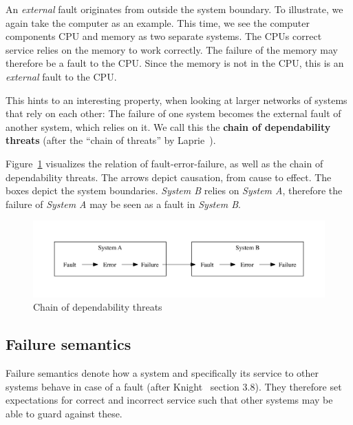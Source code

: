 An \emph{external} fault originates from outside the system boundary. To illustrate, we again take the computer as an example. This time, we see the computer components CPU and memory as two separate systems. The CPUs correct service relies on the memory to work correctly. The failure of the memory may therefore be a fault to the CPU. Since the memory is not in the CPU, this is an \emph{external} fault to the CPU.

This hints to an interesting property, when looking at larger networks of systems that rely on each other: The failure of one system becomes the external fault of another system, which relies on it. We call this the \textbf{chain of dependability threats} (after the ``chain of threats'' by Laprie~\cite{Laprie2004}).

Figure~\ref{fig:depchain} visualizes the relation of fault-error-failure, as well as the chain of dependability threats. The arrows depict causation, from cause to effect. The boxes depict the system boundaries. \emph{System B} relies on \emph{System A}, therefore the failure of \emph{System A} may be seen as a fault in \emph{System B}.

\begin{figure}[!h]
  \includegraphics[width=\columnwidth] {images/chain-of-dep-threats.pdf}
  \caption{Chain of dependability threats}
  \label{fig:depchain}
\end{figure}

\subsection{Failure semantics}
\label{ss:failure semantics}

Failure semantics denote how a system and specifically its service to other systems behave in case of a fault (after Knight~\cite{FundamentalsDepComputing} section 3.8). They therefore set expectations for correct and incorrect service such that other systems may be able to guard against these.

